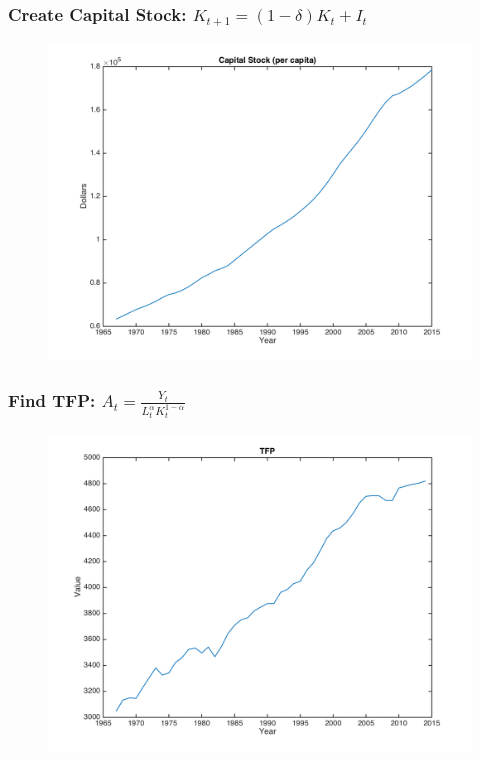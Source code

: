 \documentclass{beamer}
\begin{document}
\begin{frame}
\frametitle[alignment=center]{Create Capital Stock: $K_{t+1}=(1-\delta)K_t+I_t$}
\begin{figure}
\centering
\includegraphics[scale=0.5]{Figures/Figure_3.png}
\end{figure}
\end{frame}

\begin{frame}
\frametitle[alignment=center]{Find TFP: $A_t=\frac{Y_t}{L_t^\alpha K_t^{1-\alpha}}$}
\begin{figure}
\centering
\includegraphics[scale=0.5]{Figures/Figure_4.png}
\end{figure}
\end{frame}
\end{document}
